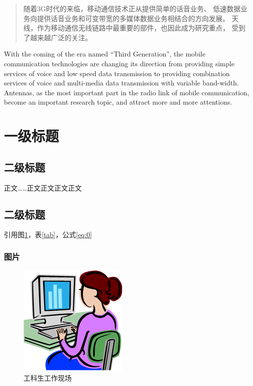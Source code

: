 \documentclass[UTF8,AutoFakeBold=1,AutoFakeSlant,zihao=-4]{cucthesis}
\begin{document}
\coverpage

\begin{abstract}
随着3G时代的来临，移动通信技术正从提供简单的话音业务、
低速数据业务向提供话音业务和可变带宽的多媒体数据业务相结合的方向发展。
天线，作为移动通信无线链路中最重要的部件，也因此成为研究重点，
受到了越来越广泛的关注。
\end{abstract}

\begin{abstractEN}
With the coming of the era named ``Third Generation'',
the mobile communication technologies are changing
its direction from providing simple services of voice
and low speed data transmission to providing combination
services of voice and multi-media data transmission with
variable band-width. Antennas, as the most important part
in the radio link of mobile communication, become an
important research topic, and attract more and more attentions.
\end{abstractEN}

\contentpage

\section{一级标题}

\subsection{二级标题}
正文……\cite{bib01}正文正文\cite{bib02}正文正文\cite{bib01,bib02}

\subsection{二级标题}
引用图\ref{fig}，表\ref{tab}，公式\eqref{eq:0}


\subsubsection{图片}

\begin{figure}[ht]
    \centering
    \includegraphics[scale=0.64]{imgs/fig.png}
    \caption{工科生工作现场}    \label{fig}
\end{figure}
\end{document}
